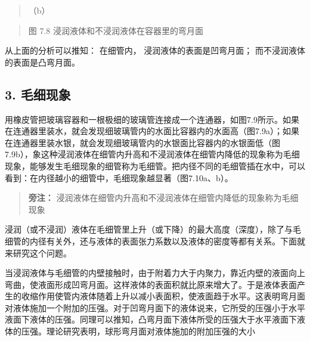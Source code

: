 \begin{quote}
（b）
\end{quote}

\begin{quote}
图 7.8 浸润液体和不浸润液体在容器里的弯月面
\end{quote}

从上面的分析可以推知： 在细管内， 浸润液体的表面是凹弯月面；
而不浸润液体的表面是凸弯月面。

\subsection{3. 毛细现象}\label{ux6bdbux7ec6ux73b0ux8c61-1}

用橡皮管把玻璃容器和一根极细的玻璃管连接成一个连通器，如图7.9所示。如果在连通器里装水，就会发现细玻璃管内的水面比容器内的水面高（图7.9a）；如果在连通器里装水银，就会发现细玻璃管内的水银面比容器内的水银面低（图7.9b），象这种浸润液体在细管内升高和不浸润液体在细管内降低的现象称为毛细现象，能够发生毛细现象的细管称为毛细管。把内径不同的毛细管插在水中，可以看到：在内径越小的细管中，毛细现象越显著（图7.10a、b）。

\begin{quote}
\textbf{旁注：}
浸润液体在细管内升高和不浸润液体在细管内降低的现象称为毛细现象
\end{quote}

浸润（或不浸润）液体在毛细管里上升（或下降）的最大高度（深度），除了与毛细管的内径有关外，还与液体的表面张力系数以及液体的密度等都有关系。下面就来研究这个问题。

当浸润液体与毛细管的内壁接触时，由于附着力大于内聚力，靠近内壁的液面向上弯曲，使液面形成凹弯月面。这样液体的表面积就比原来增大了。于是液体表面产生的收缩作用使管内液体随着上升以减小表面积，使液面趋于水平。这表明弯月面对液体施加一个附加的压强。对于凹弯月面下的液体说来，它所受的压强小于水平液面下液体的压强。同理可以推知，凸弯月面下液体所受的压强大于水平液面下液体的压强。理论研究表明，球形弯月面对液体施加的附加压强的大小


